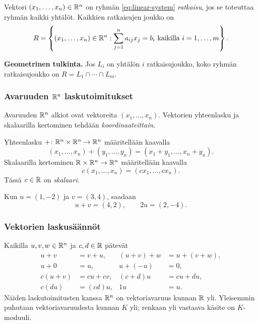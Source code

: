 \documentclass[11pt,a4paper]{amsart}
\begin{document}
  \begin{definition}
    Vektori $(x_1,\ldots,x_n)\in\mathbb{R}^n$ on ryhmän
    \eqref{eq:linear-system} \emph{ratkaisu}, jos se toteuttaa ryhmän
    kaikki yhtälöt. Kaikkien ratkaisujen joukko on
    \[
      R=\left\{(x_1,\ldots,x_n)\in\mathbb{R}^n:
      \sum_{j=1}^n a_{ij}x_j=b_i\ \text{kaikilla }i=1,\ldots,m\right\}.
    \]
  \end{definition}

  \noindent\textbf{Geometrinen tulkinta.}
  Jos $L_i$ on yhtälön $i$ ratkaisujoukko, koko ryhmän ratkaisujoukko on
  $R=L_1\cap\cdots\cap L_m$.

  \subsubsection*{Avaruuden \texorpdfstring{$\mathbb{R}^n$}{Rⁿ} laskutoimitukset}

  Avaruuden $\mathbb{R}^n$ alkiot ovat vektoreita $(x_1,\ldots,x_n)$.
  Vektorien yhteenlasku ja skalaarilla kertominen tehdään
  \emph{koordinaateittain}.

  \begin{definition}
    Yhteenlasku $+\colon\mathbb{R}^n\times\mathbb{R}^n\to\mathbb{R}^n$ määritellään kaavalla
    \[
      \boxed{(x_1,\ldots,x_n)+(y_1,\ldots,y_n)
      =(x_1+y_1,\ldots,x_n+y_n).}
    \]
    Skalaarilla kertominen $\mathbb{R}\times\mathbb{R}^n\to\mathbb{R}^n$ määritellään kaavalla
    \[
      \boxed{c(x_1,\ldots,x_n)=(cx_1,\ldots,cx_n).}
    \]
    Tässä $c\in\mathbb{R}$ on \emph{skalaari}.
  \end{definition}

  \begin{example}
    Kun $u=(1,-2)$ ja $v=(3,4)$, saadaan
    \[
      u+v=(4,2),\qquad 2u=(2,-4).
    \]
  \end{example}

  \subsubsection*{Vektorien laskusäännöt}
  Kaikilla $u,v,w\in\mathbb{R}^n$ ja $c,d\in\mathbb{R}$ pätevät
  \begin{align*}
    u+v&=v+u, & (u+v)+w&=u+(v+w),\\
    u+0&=u, & u+(-u)&=0,\\
    c(u+v)&=cu+cv, & (c+d)u&=cu+du,\\
    c(du)&=(cd)u, & 1u&=u.
  \end{align*}
  Näiden laskutoimitusten kanssa $\mathbb{R}^n$ on vektoriavaruus kunnan
  $\mathbb{R}$ yli. Yleisemmin puhutaan vektoriavaruudesta kunnan $K$ yli;
  renkaan yli vastaava käsite on $K$-moduuli.
\end{document}
